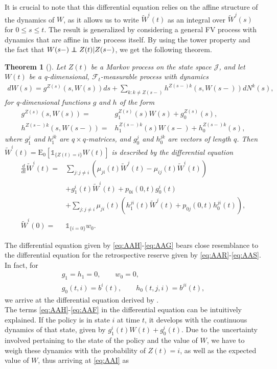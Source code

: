 \documentclass[12pt]{article}
\newcommand{\E}{\text{E}}
\newcommand{\indic}[1]{\mathds{1}_{ \{ #1 \} }}
\newcommand{\noin}{\noindent}
\newcommand\independent{\protect\mathpalette{\protect\independenT}{\perp}}
\def\independenT#1#2{\mathrel{\rlap{$#1#2$}\mkern2mu{#1#2}}}
\theoremstyle{my_thm}
\newtheorem{thm}{Theorem}[section]
\begin{document}
It is crucial to note that this differential equation relies on the affine structure of the dynamics of $W$, as it allows us to write $\tilde{W}^i(t)$ as an integral over $\tilde{W}^j(s)$ for $0\leq s \leq t$. The result is generalized by considering a general FV process with dynamics that are affine in the process itself. By using the tower property and the fact that $W(s-)\independent Z(t)|Z(s-)$, we get the following theorem.
\begin{thm}[]
\label{thm:Diff_1}
Let $Z(t)$ be a Markov process on the state space $\mathcal{J}$, and let $W(t)$ be a q-dimensional, $\mathcal{F}_t$-measurable process with dynamics
\begin{align*}
dW(s)=  g^{Z(s)}(s,W(s))ds+
 \sum_{k:k \neq Z(s-)} h^{Z(s-)k}(s,W(s-)) dN^k(s),
\end{align*}
for q-dimensional functions $g$ and $h$ of the form
\begin{align*}
g^{Z(s)}(s,W(s))=&g^{Z(s)}_1(s) W(s)+g_0^{Z(s)}(s),
\\
h^{Z(s-)k}(s,W(s-))=&h_1^{Z(s-)k}(s) W(s-)+h_0^{Z(s-)k}(s),
\end{align*}
where $g_1^j$ and $h^{jk}_1$ are $q\times q$-matrices, and $g^j_0$ and $h^{jk}_0$ are vectors of length $q$. Then $\tilde{W}^i(t)=\E_0[\indic{Z(t)=i}W(t)]$ is described by the differential equation
\begin{align}
\frac{d}{dt}\tilde{W}^i(t)=&
\sum_{j:j \neq i} \left( \mu_{ji}(t) \tilde{W}^j(t)-\mu_{ij}(t)\tilde{W}^i(t) \right)
 \label{eq:AAH} \\
&+
 g_1^i(t)\tilde{W}^i(t)+p_{0i}(0,t)g_0^i(t)
 \label{eq:AAI}\\
&+
\sum_{j:j\neq i} \mu_{ji}(t) \left(  h_1^{ji}(t) \tilde{W}^j(t) + p_{0j}(0,t)h_0^{ji}(t)\right) ,\label{eq:AAF}
\\
\tilde{W}^i(0)=&\indic{i=0}w_0 .\label{eq:AAG}
\end{align}
\end{thm}
\noin The differential equation given by \eqref{eq:AAH}-\eqref{eq:AAG} bears close resemblance to the differential equation for the retrospective reserve given by \eqref{eq:AAR}-\eqref{eq:AAS}. In fact, for
\begin{gather*}
g_1=h_1=0, \qquad w_0=0,
\\
g_0(t,i)=b^{i}(t),\qquad h_0(t,j,i)=b^{ji}(t),
\end{gather*}
we arrive at the differential equation derived by \citet{Norberg}.
\\[12pt]
The terms \eqref{eq:AAH}-\eqref{eq:AAF} in the differential equation can be intuitively explained. If the policy is in state $i$ at time $t$, it develops with the continuous dynamics of that state, given by $g^i_1(t)W(t)+g_0^i(t)$. Due to the uncertainty involved pertaining to the state of the policy and the value of $W$, we have to weigh these dynamics with the probability of $Z(t)=i$, as well as the expected value of $W$, thus arriving at \eqref{eq:AAI} as
\end{document}
